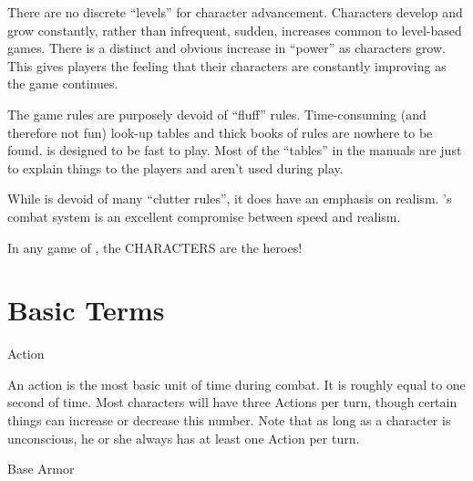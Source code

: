 \documentclass[twoside]{book}
\begin{document}
              
              
                 There are no discrete “levels” for
                 character advancement. Characters develop and grow
                 constantly, rather than infrequent, sudden, increases
                 common to level-based games. There is a distinct and
                 obvious increase in “power” as characters
                 grow. This gives players the feeling that their
                 characters are constantly improving as the game
                 continues. 
              
              
                The game rules are purposely devoid of
                “fluff” rules. Time-consuming (and therefore
                not fun) look-up tables and thick books of rules are
                nowhere to be found. \APATHY{}  is designed to be fast
                to play. Most of the “tables” in the \APATHY{}  manuals are just to explain things to the players and
                aren’t used during play.
                
              
              
                While \APATHY{}  is devoid of many “clutter
                rules”, it does have an emphasis on realism.
                \APATHY{}’s combat system is an excellent
                compromise between speed and realism.
                
              
           In any game of \APATHY{}, the CHARACTERS are the
            heroes!
          
\section{Basic Terms}
      
              
              
                 Action 
                
                 An action is the most basic unit of time during
                 combat. It is roughly equal to one second of time. Most
                 characters will have three Actions per turn, though
                 certain things can increase or decrease this number.
                 Note that as long as a character is unconscious, he or
                 she always has at least one Action per turn. 
              
              
              
                 Base Armor 
                
\end{document}
